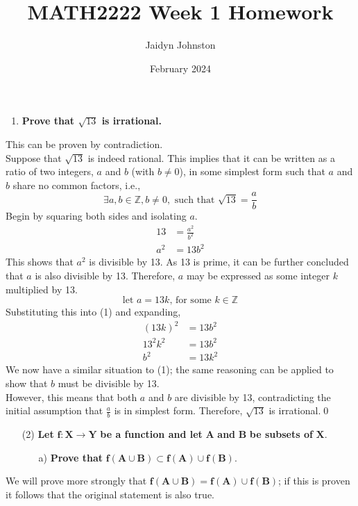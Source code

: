 \documentclass{amsart}
\title{MATH2222 Week 1 Homework}
\author{Jaidyn Johnston}
\date{February 2024}
\begin{document}
\maketitle
\begin{enumerate}
    \item \textbf{Prove that $\sqrt{13}$ is irrational.}
\end{enumerate}
This can be proven by contradiction.\\
Suppose that $\sqrt{13}$ is indeed rational. This implies that it can be written as a ratio of two integers, $a$ and $b$ (with $b\neq 0$), in some simplest form such that $a$ and $b$ share no common factors, i.e.,
$$
\exists a,b\in \mathbb{Z}, b\neq 0, \textrm{ such that } \sqrt{13} = \frac{a}{b}
$$
Begin by squaring both sides and isolating $a$.
\begin{align*}
13 &= \frac{a^{2}}{b^{2}}\\
a^{2} &= 13b^{2}\tag{1}
\end{align*}
This shows that $a^{2}$ is divisible by 13. As 13 is prime, it can be further concluded that $a$ is also divisible by 13. Therefore, $a$ may be expressed as some integer $k$ multiplied by 13.
$$
\textrm{let }a = 13k\textrm{, for some } k\in\mathbb{Z}
$$
Substituting this into (1) and expanding,
\begin{align*}
    (13k)^{2} &= 13b^{2}\\
    13^{2}k^{2} &= 13b^{2}\\
    b^{2} &= 13k^{2}
\end{align*}
We now have a similar situation to (1); the same reasoning can be applied to show that $b$ must be divisible by 13.\\
However, this means that both $a$ and $b$ are divisible by 13, contradicting the initial assumption that $\frac{a}{b}$ is in simplest form. Therefore, $\sqrt{13}$ is irrational.\qed
\\
\begin{enumerate}
    \item [(2)] \textbf{Let }$\mathbf{f : X\longrightarrow Y}$\textbf{ be a function and let }$\mathbf{A}$\textbf{ and }$\mathbf{B}$\textbf{ be subsets of }$\mathbf{X}$.
    \begin{itemize}
        \item [a)] \textbf{Prove that }$\mathbf{f(A\cup B)\subset f(A)\cup f(B)}$.
    \end{itemize}
\end{enumerate}
We will prove more strongly that $\mathbf{f(A\cup B) = f(A)\cup f(B)}$; if this is proven it follows that the original statement is also true.\\
\end{document}
